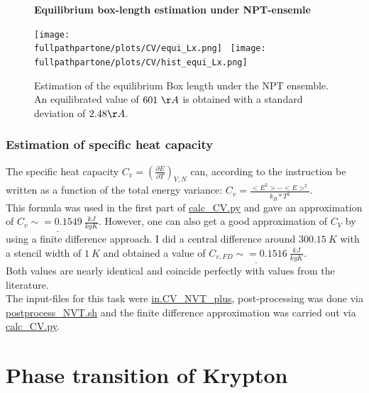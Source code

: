 \documentclass[10pt,a4paper]{report}
\def \pathpartone {../../1_three-dimensional_atomic_system}
\def \fullpathpartone {/home/lukas/Desktop/project/independence/atomistic_modeling/exam/1_three-dimensional_atomic_system}
\newcommand*{\figuretitle}[1]{%
    {\centering%
    \textbf{#1}%
    \par\medskip}%
}
\begin{document}
\begin{center}
\begin{figure}[h]
\figuretitle{Equilibrium box-length estimation under NPT-ensemle}
\texttt{[image: \\fullpathpartone/plots/CV/equi\_Lx.png]}~
\texttt{[image: \\fullpathpartone/plots/CV/hist\_equi\_Lx.png]}
\caption[Equilibrium box-length estimation under NPT-ensemle]{Estimation of the equilibrium Box length under the NPT ensemble. An equilibrated  value of $601~\AA$ is obtained with a standard deviation of $2.48 \AA$.}
\label{fig:p1_CV_equi_NPT_lx}
\end{figure}
\end{center}


\subsubsection{Estimation of specific heat capacity}
The specific heat capacity $C_v=\left(\frac{\partial E}{\partial T}\right)_{V,N}$ can, according to the instruction be written as a function of the total energy variance: $C_v=\frac{<E^2>-<E>^2}{k_B*T^2}$.\\
This formula was used in the first part of \href{\pathpartone/calc_CV.py}{calc\_CV.py} and gave an approximation of $\underline{C_v \sim=0.1549~\frac{kJ}{kg K}}$.
However, one can also get a good approximation of $C_V$ by using a finite difference approach.
I did a central difference around $300.15~K$ with a stencil width of $1~K$ and obtained a value of $\underline{C_{v,FD} \sim=0.1516~\frac{kJ}{kg K}}$.\\
Both values are nearly identical and coincide perfectly with values from the literature.\\
The input-files for this task were \href{\pathpartone/in.CV_NVT_plus}{in.CV\_NVT\_plus}, post-processing was done via \href{\pathpartone/postprocess_NVT.sh}{postprocess\_NVT.sh} and the finite difference approximation was carried out via \href{\pathpartone/calc_CV.py}{calc\_CV.py}.









\section{Phase transition of Krypton}
\end{document}

